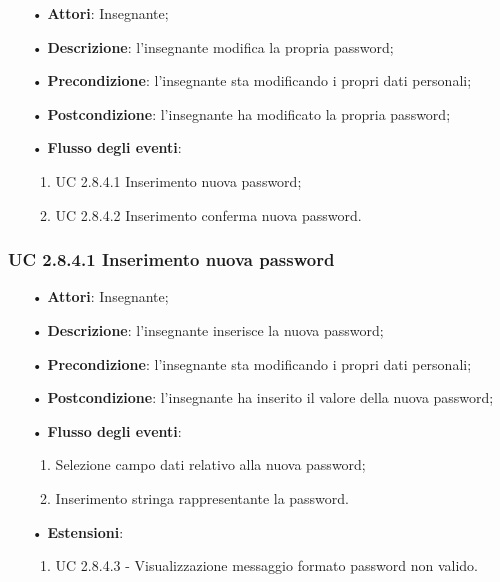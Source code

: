 \begin{itemize}
	\item[•]\textbf{Attori}: Insegnante;
	\item[•]\textbf{Descrizione}: l'insegnante modifica la propria password;
	\item[•]\textbf{Precondizione}: l'insegnante sta modificando i propri dati personali;
	\item[•]\textbf{Postcondizione}: l'insegnante ha modificato la propria password; 
	\item[•]\textbf{Flusso degli eventi}: 
	\begin{enumerate}
		\item UC 2.8.4.1 Inserimento nuova password;
		\item UC 2.8.4.2 Inserimento conferma nuova password.
	\end{enumerate}
\end{itemize}

\subsubsection{UC 2.8.4.1 Inserimento nuova password}
\begin{itemize}
	\item[•]\textbf{Attori}: Insegnante;
	\item[•]\textbf{Descrizione}: l'insegnante inserisce la nuova password;
	\item[•]\textbf{Precondizione}: l'insegnante sta modificando i propri dati personali;
	\item[•]\textbf{Postcondizione}: l'insegnante ha inserito il valore della nuova password; 
	\item[•]\textbf{Flusso degli eventi}: 
	\begin{enumerate}
		\item Selezione campo dati relativo alla nuova password;
		\item Inserimento stringa rappresentante la password.
	\end{enumerate}
	\item[•]\textbf{Estensioni}:
	\begin{enumerate}
		\item UC 2.8.4.3 - Visualizzazione messaggio formato password non valido.
	\end{enumerate}
\end{itemize}

